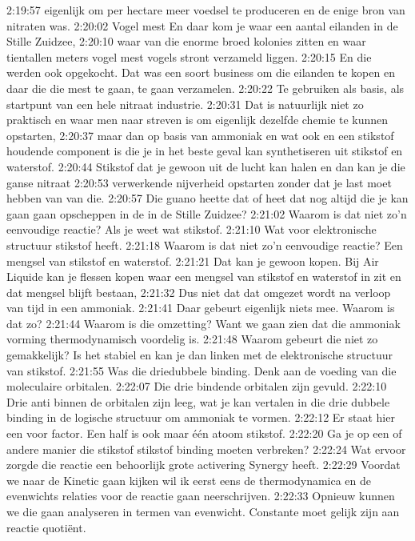 2:19:57
eigenlijk om per hectare meer voedsel te produceren en de enige bron van nitraten was.
2:20:02
Vogel mest En daar kom je waar een aantal eilanden in de Stille Zuidzee,
2:20:10
waar van die enorme broed kolonies zitten en waar tientallen meters vogel mest vogels stront verzameld liggen.
2:20:15
En die werden ook opgekocht. Dat was een soort business om die eilanden te kopen en daar die die mest te gaan, te gaan verzamelen.
2:20:22
Te gebruiken als basis, als startpunt van een hele nitraat industrie.
2:20:31
Dat is natuurlijk niet zo praktisch en waar men naar streven is om eigenlijk dezelfde chemie te kunnen opstarten,
2:20:37
maar dan op basis van ammoniak en wat ook en een stikstof houdende component is die je in het beste geval kan synthetiseren uit stikstof en waterstof.
2:20:44
Stikstof dat je gewoon uit de lucht kan halen en dan kan je die ganse nitraat
2:20:53
verwerkende nijverheid opstarten zonder dat je last moet hebben van van die.
2:20:57
Die guano heette dat of heet dat nog altijd die je kan gaan gaan opscheppen in de in de Stille Zuidzee?
2:21:02
Waarom is dat niet zo'n eenvoudige reactie? Als je weet wat stikstof.
2:21:10
Wat voor elektronische structuur stikstof heeft.
2:21:18
Waarom is dat niet zo'n eenvoudige reactie? Een mengsel van stikstof en waterstof.
2:21:21
Dat kan je gewoon kopen. Bij Air Liquide kan je flessen kopen waar een mengsel van stikstof en waterstof in zit en dat mengsel blijft bestaan,
2:21:32
Dus niet dat dat omgezet wordt na verloop van tijd in een ammoniak.
2:21:41
Daar gebeurt eigenlijk niets mee. Waarom is dat zo?
2:21:44
Waarom is die omzetting? Want we gaan zien dat die ammoniak vorming thermodynamisch voordelig is.
2:21:48
Waarom gebeurt die niet zo gemakkelijk? Is het stabiel en kan je dan linken met de elektronische structuur van stikstof.
2:21:55
Was die driedubbele binding. Denk aan de voeding van die moleculaire orbitalen.
2:22:07
Die drie bindende orbitalen zijn gevuld.
2:22:10
Drie anti binnen de orbitalen zijn leeg, wat je kan vertalen in die drie dubbele binding in de logische structuur om ammoniak te vormen.
2:22:12
Er staat hier een voor factor. Een half is ook maar één atoom stikstof.
2:22:20
Ga je op een of andere manier die stikstof stikstof binding moeten verbreken?
2:22:24
Wat ervoor zorgde die reactie een behoorlijk grote activering Synergy heeft.
2:22:29
Voordat we naar de Kinetic gaan kijken wil ik eerst eens de thermodynamica en de evenwichts relaties voor de reactie gaan neerschrijven.
2:22:33
Opnieuw kunnen we die gaan analyseren in termen van evenwicht. Constante moet gelijk zijn aan reactie quotiënt.
